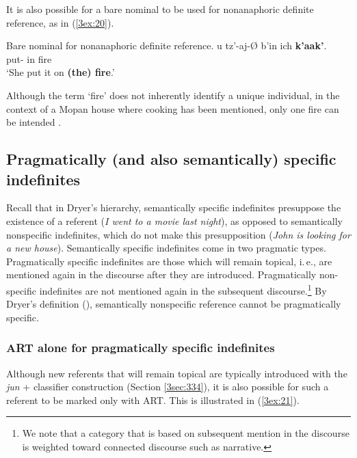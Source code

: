 \documentclass[output=paper]{langsci/langscibook}
\begin{document}
It is also possible for a bare nominal to be used for nonanaphoric definite reference, as in (\ref{3ex:20}).

\begin{exe}
\ex\label{3ex:20}
Bare nominal for nonanaphoric definite reference. 
\exi{}
\gll	u		tz'-aj-{\O}			b'in 			ich 	{\bf{k'aak'}}. \\
	{}	put-{}	{}		in	fire \\
\glt	`She put it on {\bf{(the) fire}}.'
\end{exe}
	
Although the term `fire' does not inherently identify a unique individual, in the context of a Mopan house where cooking has been mentioned, only one fire can be intended \citep[see, e.\,g.,][285]{lobner:11}.


\subsection{Pragmatically (and also semantically) specific indefinites}\label{3sec:33}

Recall that in Dryer's hierarchy, semantically specific indefinites presuppose the existence of a referent ({\emph{I went to a movie last night}}), as opposed to semantically nonspecific indefinites, which do not make this presupposition ({\emph{John is looking for a new house}}). Semantically specific indefinites come in two pragmatic types. Pragmatically specific indefinites are those which will remain topical, i.\,e., are mentioned again in the discourse after they are introduced. Pragmatically non-specific indefinites are not mentioned again in the subsequent discourse.\footnote{We note that a category that is based on subsequent mention in the discourse is weighted toward connected discourse such as narrative.} By Dryer's definition (\citeyear[][e237]{dryer:14}), semantically nonspecific reference cannot be pragmatically specific.

\subsubsection{ART alone for pragmatically specific indefinites}\label{3sec:331}

Although new referents that will remain topical are typically introduced with the {\emph{jun}} + classifier construction (Section \ref{3sec:334}), it is also possible for such a referent to be marked only with ART.  This is illustrated in (\ref{3ex:21}).
\end{document}
